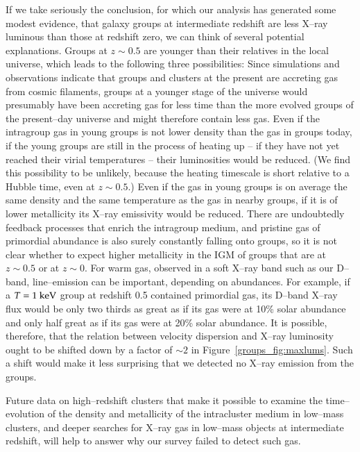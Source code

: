 If we take seriously the conclusion, for which our analysis has
generated some modest evidence, that galaxy groups at intermediate
redshift are less X--ray luminous than those at redshift zero, we can
think of several potential explanations.  Groups at $z \sim 0.5$ are
younger than their relatives in the local universe, which leads to the
following three possibilities:  Since simulations and
observations indicate that groups and clusters at the present are
accreting gas from cosmic filaments, groups at a younger stage of the
universe would presumably have been accreting gas for less time than
the more evolved groups of the present--day universe and might
therefore contain less gas.   Even if the intragroup gas in
young groups is not lower density than the gas in groups today, if the
young groups are still in the process of heating up -- if they have
not yet reached their virial temperatures -- their luminosities would
be reduced. (We find this possibility to be unlikely, because the
heating timescale is short relative to a Hubble time, even at $z \sim
0.5$.)   Even if the gas in young groups is on average the
same density and the same temperature as the gas in nearby groups, if
it is of lower metallicity its X--ray emissivity would be reduced.
There are undoubtedly feedback processes that enrich the intragroup
medium, and pristine gas of primordial abundance is also surely
constantly falling onto groups, so it is not clear whether to expect
higher metallicity in the IGM of groups that are at $z \sim 0.5$ or at
$z \sim 0$. For warm gas, observed in a soft X--ray band such as our
D--band, line--emission can be important, depending on abundances.
For example, if a $T = 1{\rm~keV}$ group at redshift 0.5 contained
primordial gas, its D--band X--ray flux would be only two thirds as
great as if its gas were at 10\% solar abundance and only half great
as if its gas were at 20\% solar abundance.  It is possible,
therefore, that the relation between velocity dispersion and X--ray
luminosity ought to be shifted down by a factor of $\sim 2$ in
Figure~\ref{groups_fig:maxlums}.  Such a shift would make it less
surprising that we detected no X--ray emission from the groups.

Future data on high--redshift clusters that make it possible to
examine the time--evolution of the density and metallicity of the
intracluster medium in low--mass clusters, and deeper searches for
X--ray gas in low--mass objects at intermediate redshift, will help to
answer why our survey failed to detect such gas.


